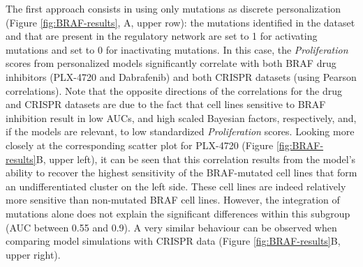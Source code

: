 \documentclass[a4paper,12pt,twoside,onecolumn,openright,final,oldfontcommands]{memoir}
\begin{document}
The first approach consists in using only mutations as discrete
personalization (Figure \ref{fig:BRAF-results}, A, upper row): the
mutations identified in the dataset and that are present in the
regulatory network are set to 1 for activating mutations and set to 0
for inactivating mutations. In this case, the \emph{Proliferation}
scores from personalized models significantly correlate with both BRAF
drug inhibitors (PLX-4720 and Dabrafenib) and both CRISPR datasets
(using Pearson correlations). Note that the opposite directions of the
correlations for the drug and CRISPR datasets are due to the fact that
cell lines sensitive to BRAF inhibition result in low AUCs, and high
scaled Bayesian factors, respectively, and, if the models are relevant,
to low standardized \emph{Proliferation} scores. Looking more closely at
the corresponding scatter plot for PLX-4720 (Figure
\ref{fig:BRAF-results}B, upper left), it can be seen that this
correlation results from the model's ability to recover the highest
sensitivity of the BRAF-mutated cell lines that form an undifferentiated
cluster on the left side. These cell lines are indeed relatively more
sensitive than non-mutated BRAF cell lines. However, the integration of
mutations alone does not explain the significant differences within this
subgroup (AUC between 0.55 and 0.9). A very similar behaviour can be
observed when comparing model simulations with CRISPR data (Figure
\ref{fig:BRAF-results}B, upper right).
\end{document}
